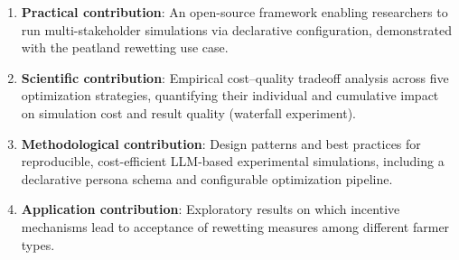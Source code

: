 \documentclass[12pt, a4paper]{article}
\begin{document}
\begin{enumerate}
    \item \textbf{Practical contribution}: An open-source framework enabling researchers to run multi-stakeholder simulations via declarative configuration, demonstrated with the peatland rewetting use case.
    \item \textbf{Scientific contribution}: Empirical cost--quality tradeoff analysis across five optimization strategies, quantifying their individual and cumulative impact on simulation cost and result quality (waterfall experiment).
    \item \textbf{Methodological contribution}: Design patterns and best practices for reproducible, cost-efficient LLM-based experimental simulations, including a declarative persona schema and configurable optimization pipeline.
    \item \textbf{Application contribution}: Exploratory results on which incentive mechanisms lead to acceptance of rewetting measures among different farmer types.
\end{enumerate}


\end{document}

